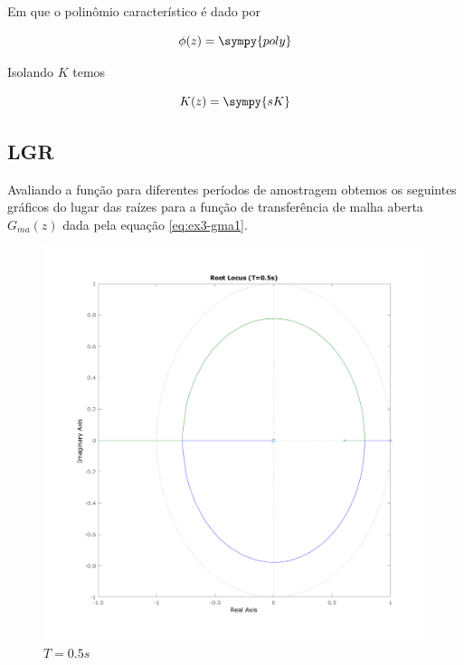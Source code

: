 \documentclass[a4paper,11pt]{article}
\begin{document}
Em que o polinômio característico é dado por

\begin{equation}
    \phi(z) = \sympy{poly}
\end{equation}

Isolando $K$ temos

\begin{equation}\label{eq:ex3-k-poly}
    K(z) = \sympy{sK}
\end{equation}

\subsection{LGR}

Avaliando a função para diferentes períodos de amostragem obtemos os seguintes gráficos do lugar das raízes para a função de transferência de malha aberta $G_{ma}(z)$ dada pela equação \ref{eq:ex3-gma1}.

\begin{figure}[H]
    \centering
    \includegraphics[width=0.9\linewidth]{img/exsim3-rlocus-t500ms.png}
    \caption{ $T=0.5s$}
\end{figure}
\end{document}
